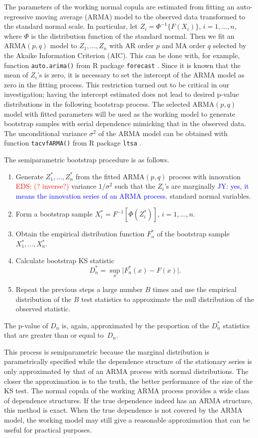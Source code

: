 \documentclass[12pt, letterpaper, titlepage]{article}
\newcommand{\jy}[1]{\textcolor{blue}{JY: #1}}
\newcommand{\eds}[1]{\textcolor{red}{EDS: (#1)}}
\begin{document}
The parameters of the working normal copula are
estimated from fitting an auto-regressive moving average (ARMA) model to the
observed data transformed to the standard normal scale. In particular, let
$Z_i = \Phi^{-1}\{ F(X_i)\}$, $i = 1, \ldots, n$, where $\Phi$ is the distribution
function of the standard normal. Then we fit an ARMA$(p, q)$ model to
$Z_1, \ldots, Z_n$ with AR order $p$ and MA order $q$ selected by the Akaike
Information Criterion (AIC). This can be done with, for example, function
\texttt{auto.arima()} from  R package \texttt{forecast}
\citep{hyndman2008automatic}. Since it is known that the mean of $Z_i$'s is
zero, it is necessary to set the intercept of the ARMA model as zero in the
fitting process. This restriction turned out to be critical in our
investigation; having the intercept estimated does not lead to desired p-value
distributions in the following bootstrap process.
The selected ARMA$(p, q)$ model with fitted
parameters will be used as the working model to generate bootstrap samples with
serial dependence mimicking that in the observed data. The unconditional
variance $\sigma^2$ of the ARMA model can be obtained with function
\texttt{tacvfARMA()} from R package \texttt{ltsa} \citep{mcleod2007algorithms}.


The semiparametric bootstrap procedure is as follows.
\begin{enumerate}
\item
  Generate $Z_1^*, \ldots, Z_n^*$ from the fitted ARMA$(p, q)$ process with
  innovation \eds{? inverse?} variance $1 / \sigma^2$ such that the $Z_i$'s are
	marginally \jy{yes, it means the innovation series of an ARMA process.}
  standard normal variables.
\item
  Form a bootstrap sample $X_i^* = F^{-1} [\Phi(Z_i^*)]$,  $i = 1, \ldots, n$.
\item
  Obtain the empirical distribution function $F_n^*$ of the bootstrap sample
  $X_1^*, \ldots, X_n^*$.
\item
  Calculate bootstrap KS statistic
  \[
    D_n^* = \sup_x \lvert F_n^* (x)- F(x) \rvert.
  \]
\item
  Repeat the previous steps a large number $B$ times and use the empirical
  distribution of the $B$ test statistics to approximate
  the null distribution of the observed statistic.
\end{enumerate}
The p-value of $D_n$ is, again, approximated by the proportion of the $D_n^*$
statistics that are greater than or equal to~$D_n$. 


This process is semiparametric because the marginal distribution is
parametrically specified while the dependence structure of the stationary series
is only approximated by that of an ARMA process with normal distributions.
The closer the approximation is to the truth, the better
performance of the size of the KS test. The normal copula of the working ARMA
process provides a wide class of dependence structures.
If the true dependence indeed has an ARMA structure, this method is exact. When
the true dependence is not covered by the ARMA model, the working model may 
still give a reasonable approximation that can
be useful for practical purposes. 
\end{document}
